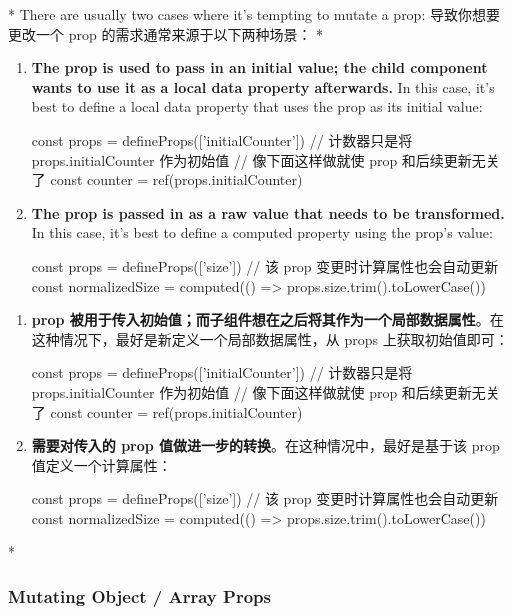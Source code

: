 \begin{paracol}{2}
\switchcolumn[0]*%
There are usually two cases where it's tempting to mutate a prop:
\switchcolumn
导致你想要更改一个 prop 的需求通常来源于以下两种场景：
\switchcolumn[0]*%
\begin{enumerate}
\item
  \textbf{The prop is used to pass in an initial value; the child
  component wants to use it as a local data property afterwards.} In
  this case, it's best to define a local data property that uses the
  prop as its initial value:
\begin{codeJs}
const props = defineProps(['initialCounter'])
// 计数器只是将 props.initialCounter 作为初始值
// 像下面这样做就使 prop 和后续更新无关了
const counter = ref(props.initialCounter)
\end{codeJs}
\item
  \textbf{The prop is passed in as a raw value that needs to be
  transformed.} In this case, it's best to define a computed property
  using the prop's value:
\begin{codeJs}
const props = defineProps(['size'])
// 该 prop 变更时计算属性也会自动更新
const normalizedSize = computed(() => props.size.trim().toLowerCase())
\end{codeJs}
\end{enumerate}
\switchcolumn
\begin{enumerate}
\item
  \textbf{prop
  被用于传入初始值；而子组件想在之后将其作为一个局部数据属性}。在这种情况下，最好是新定义一个局部数据属性，从
  props 上获取初始值即可：
\begin{codeJs}
const props = defineProps(['initialCounter'])
// 计数器只是将 props.initialCounter 作为初始值
// 像下面这样做就使 prop 和后续更新无关了
const counter = ref(props.initialCounter)
\end{codeJs}
\item
  \textbf{需要对传入的 prop
  值做进一步的转换}。在这种情况中，最好是基于该 prop
  值定义一个计算属性：
\begin{codeJs}
const props = defineProps(['size'])
// 该 prop 变更时计算属性也会自动更新
const normalizedSize = computed(() => props.size.trim().toLowerCase())
\end{codeJs}
\end{enumerate}


\switchcolumn[0]*%
\subsubsection{Mutating Object / Array Props}
\switchcolumn

\end{paracol}
